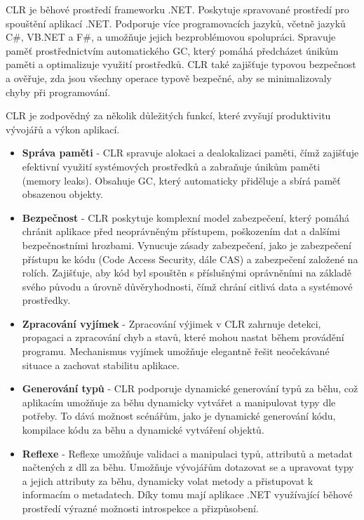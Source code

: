 
 CLR je běhové prostředí frameworku .NET. Poskytuje spravované prostředí pro spouštění aplikací .NET. Podporuje více programovacích jazyků, včetně jazyků C\#, VB.NET a F\#, a umožňuje jejich bezproblémovou spolupráci. Spravuje paměť prostřednictvím automatického GC, který pomáhá předcházet únikům paměti a optimalizuje využití prostředků. CLR také zajišťuje typovou bezpečnost a ověřuje, zda jsou všechny operace typově bezpečné, aby se minimalizovaly chyby při programování.

CLR je zodpovědný za několik důležitých funkcí, které zvyšují produktivitu vývojářů a výkon aplikací.

\begin{itemize}
    \item \textbf{Správa paměti} - CLR spravuje alokaci a dealokalizaci paměti, čímž zajišťuje efektivní využití systémových prostředků a zabraňuje únikům paměti (memory leaks). Obsahuje GC, který automaticky přiděluje a sbírá paměť obsazenou objekty.
    \item \textbf{Bezpečnost} - CLR poskytuje komplexní model zabezpečení, který pomáhá chránit aplikace před neoprávněným přístupem, poškozením dat a dalšími bezpečnostními hrozbami. Vynucuje zásady zabezpečení, jako je zabezpečení přístupu ke kódu (Code Access Security, dále CAS) a zabezpečení založené na rolích. Zajišťuje, aby kód byl spouštěn s příslušnými oprávněními na základě svého původu a úrovně důvěryhodnosti, čímž chrání citlivá data a systémové prostředky.
    \item \textbf{Zpracování vyjímek} - Zpracování výjimek v CLR zahrnuje detekci, propagaci a zpracování chyb a stavů, které mohou nastat během provádění programu. Mechanismus vyjímek umožňuje elegantně řešit neočekávané situace a zachovat stabilitu aplikace.
    \item \textbf{Generování typů} - CLR podporuje dynamické generování typů za běhu, což aplikacím umožňuje za běhu dynamicky vytvářet a manipulovat typy dle potřeby. To dává možnost scénářům, jako je dynamické generování kódu, kompilace kódu za běhu a dynamické vytváření objektů.
    \item \textbf{Reflexe} - Reflexe umožňuje validaci a manipulaci typů, attributů a metadat načtených z dll za běhu. Umožňuje vývojářům dotazovat se a upravovat typy a jejich attributy za běhu, dynamicky volat metody a přistupovat k informacím o metadatech. Díky tomu mají aplikace .NET využívající běhové prostředí výrazné možnosti introspekce a přizpůsobení.
\end{itemize}

